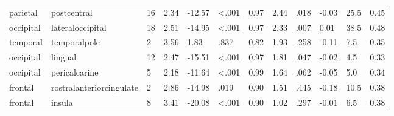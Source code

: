 \documentclass{article}
\begin{document}
\begin{longtable}{llR{1.5cm}R{1cm}R{1.3cm}R{1cm}R{1cm}R{1.3cm}R{1cm}R{1.8cm}R{1.3cm}R{1.8cm}}
  parietal &               postcentral &           16 &                  2.34 &           -12.57 &      \textless.001 &                               0.97 &                          2.44 &                            .018 & -0.03 &   25.5 &      0.45 \\
 occipital &          lateraloccipital &           18 &                  2.51 &           -14.95 &      \textless.001 &                               0.97 &                          2.33 &                            .007 &  0.01 &   38.5 &      0.48 \\
  temporal &              temporalpole &            2 &                  3.56 &             1.83 &               .837 &                               0.82 &                          1.93 &                            .258 & -0.11 &    7.5 &      0.35 \\
 occipital &                   lingual &           12 &                  2.47 &           -15.51 &      \textless.001 &                               0.97 &                          1.81 &                            .047 & -0.02 &    4.5 &      0.33 \\
 occipital &             pericalcarine &            5 &                  2.18 &           -11.64 &      \textless.001 &                               0.99 &                          1.64 &                            .062 & -0.05 &    5.0 &      0.34 \\
   frontal &  rostralanteriorcingulate &            2 &                  2.86 &           -14.98 &               .019 &                               0.90 &                          1.51 &                            .445 & -0.18 &   10.5 &      0.38 \\
   frontal &                    insula &            8 &                  3.41 &           -20.08 &      \textless.001 &                               0.90 &                          1.02 &                            .297 & -0.01 &    6.5 &      0.38 \\
\end{longtable}
\end{document}
